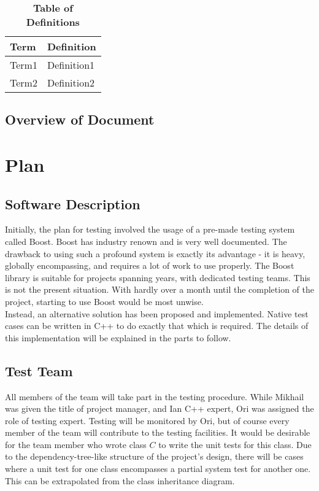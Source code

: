 \documentclass[12pt, titlepage]{article}
\begin{document}
			\begin{table}[!htbp]
				\caption{\textbf{Table of Definitions}} \label{Table}

				\begin{tabularx}{\textwidth}{p{3cm}X}
				\toprule
				\textbf{Term} & \textbf{Definition}\\
				\midrule
				Term1 & Definition1\\
				Term2 & Definition2\\
				\bottomrule
			\end{tabularx}

		\end{table}	

	\subsection{Overview of Document}

\section{Plan}
		
	\subsection{Software Description}

	Initially, the plan for testing involved the usage of a pre-made testing system called Boost. Boost has industry renown and is very well documented. The drawback to using such a profound system is exactly its advantage - it is heavy, globally encompassing, and requires a lot of work to use properly. The Boost library is suitable for projects spanning years, with dedicated testing teams. This is not the present situation. With hardly over a month until the completion of the project, starting to use Boost would be most unwise.\\

	Instead, an alternative solution has been proposed and implemented. Native test cases can be written in C++ to do exactly that which is required. The details of this implementation will be explained in the parts to follow.

	\subsection{Test Team}

	All members of the team will take part in the testing procedure. While Mikhail was given the title of project manager, and Ian C++ expert, Ori was assigned the role of testing expert. Testing will be monitored by Ori, but of course every member of the team will contribute to the testing facilities. It would be desirable for the team member who wrote class $C$ to write the unit tests for this class. Due to the dependency-tree-like structure of the project's design, there will be cases where a unit test for one class encompasses a partial system test for another one. This can be extrapolated from the class inheritance diagram.
\end{document}
